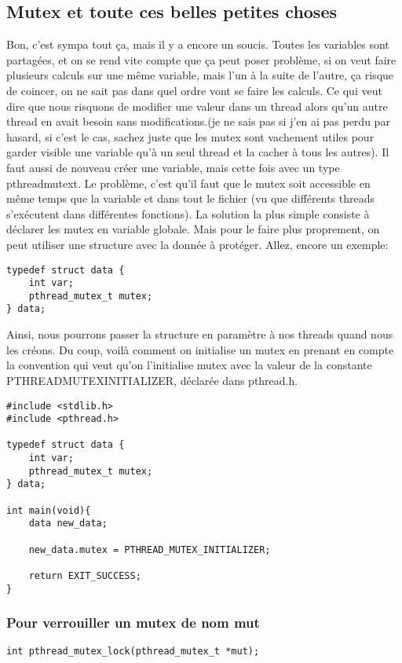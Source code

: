 \documentclass[a4paper]{article}
\begin{document}
\subsection{Mutex et toute ces belles petites choses}
Bon, c'est sympa tout ça, mais il y a encore un soucis. Toutes les variables sont partagées, et on se rend vite compte que ça peut poser problème, si on veut faire plusieurs calculs sur une même variable, mais l'un à la suite de l'autre, ça risque de coincer, on ne sait pas dans quel ordre vont se faire les calculs. Ce qui veut dire que nous risquons de modifier une valeur dans un thread alors qu'un autre thread en avait besoin sans modifications.(je ne sais pas si j'en ai pas perdu par hasard, si c'est le cas, sachez juste que les mutex sont vachement utiles pour garder visible une variable qu'à un seul thread et la cacher à tous les autres).\newline
Il faut aussi de nouveau créer une variable, mais cette fois avec un type \guillemotleft{}pthread\textunderscore{}mutex\textunderscore{}t\guillemotright{}.\newline
Le problème, c'est qu'il faut que le mutex soit accessible en même temps que la variable et dans tout le fichier (vu que différents threads s'exécutent dans différentes fonctions). La solution la plus simple consiste à déclarer les mutex en variable globale. Mais pour le faire plus proprement, on peut utiliser une structure avec la donnée à protéger. Allez, encore un exemple:
\begin{lstlisting}
typedef struct data {
    int var;
    pthread_mutex_t mutex;
} data;
\end{lstlisting}
Ainsi, nous pourrons passer la structure en paramètre à nos threads quand nous les créons.\newline
Du coup, voilà comment on initialise un mutex en prenant en compte la convention qui veut qu'on l'initialise mutex avec la valeur de la constante PTHREAD\textunderscore{}MUTEX\textunderscore{}INITIALIZER, déclarée dans pthread.h.
\begin{lstlisting}
#include <stdlib.h>
#include <pthread.h>

typedef struct data {
    int var;
    pthread_mutex_t mutex;
} data;

int main(void){
    data new_data;

    new_data.mutex = PTHREAD_MUTEX_INITIALIZER;

    return EXIT_SUCCESS;
}
\end{lstlisting}

\subsubsection{Pour verrouiller un mutex de nom mut}
\begin{lstlisting}
int pthread_mutex_lock(pthread_mutex_t *mut);
\end{lstlisting}
\end{document}
